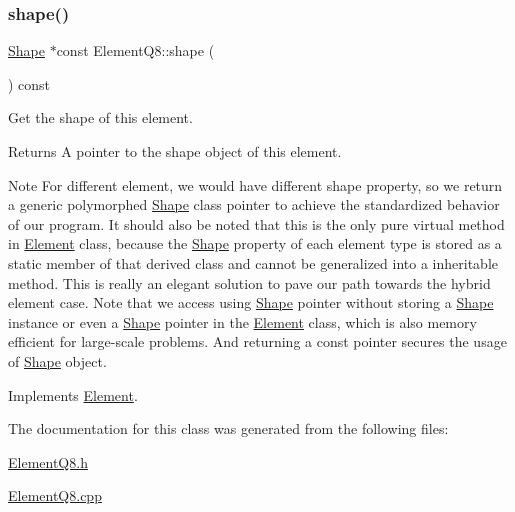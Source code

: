 \subsubsection{\texorpdfstring{shape()}{shape()}}
{\footnotesize\ttfamily \mbox{\hyperlink{class_shape}{Shape}} $\ast$const Element\+Q8\+::shape (\begin{DoxyParamCaption}{ }\end{DoxyParamCaption}) const\hspace{0.3cm}{\ttfamily [virtual]}}



Get the shape of this element. 

\begin{DoxyReturn}{Returns}
A pointer to the shape object of this element.
\end{DoxyReturn}
\begin{DoxyNote}{Note}
For different element, we would have different shape property, so we return a generic polymorphed \mbox{\hyperlink{class_shape}{Shape}} class pointer to achieve the standardized behavior of our program. It should also be noted that this is the only pure virtual method in \mbox{\hyperlink{class_element}{Element}} class, because the \mbox{\hyperlink{class_shape}{Shape}} property of each element type is stored as a static member of that derived class and cannot be generalized into a inheritable method. This is really an elegant solution to pave our path towards the hybrid element case. Note that we access using \mbox{\hyperlink{class_shape}{Shape}} pointer without storing a \mbox{\hyperlink{class_shape}{Shape}} instance or even a \mbox{\hyperlink{class_shape}{Shape}} pointer in the \mbox{\hyperlink{class_element}{Element}} class, which is also memory efficient for large-\/scale problems. And returning a const pointer secures the usage of \mbox{\hyperlink{class_shape}{Shape}} object. 
\end{DoxyNote}


Implements \mbox{\hyperlink{class_element_aadc36f89fa5f11da7e74d6528ecdcacc}{Element}}.



The documentation for this class was generated from the following files\+:\begin{DoxyCompactItemize}
\item 
\mbox{\hyperlink{_element_q8_8h}{Element\+Q8.\+h}}\item 
\mbox{\hyperlink{_element_q8_8cpp}{Element\+Q8.\+cpp}}\end{DoxyCompactItemize}
